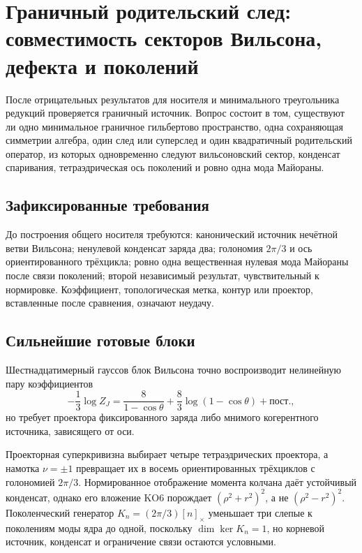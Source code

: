 \chapter{Граничный родительский след: совместимость секторов Вильсона, дефекта и поколений}

После отрицательных результатов для носителя и минимального треугольника
редукций проверяется граничный источник. Вопрос состоит в том, существуют ли
одно минимальное граничное гильбертово пространство, одна сохраняющая
симметрии алгебра, один след или суперслед и один квадратичный родительский
оператор, из которых одновременно следуют вильсоновский сектор, конденсат
спаривания, тетраэдрическая ось поколений и ровно одна мода Майораны.

\section{Зафиксированные требования}

До построения общего носителя требуются: канонический источник нечётной
ветви Вильсона; ненулевой конденсат заряда два; голономия \(2\pi/3\) и ось
ориентированного трёхцикла; ровно одна вещественная нулевая мода Майораны
после связи поколений; второй независимый результат, чувствительный к
нормировке. Коэффициент, топологическая метка, контур или проектор,
вставленные после сравнения, означают неудачу.

\section{Сильнейшие готовые блоки}

Шестнадцатимерный гауссов блок Вильсона точно воспроизводит нелинейную пару
коэффициентов
\begin{equation}
 -\frac13\log Z_J
 =\frac8{1-\cos\theta}+\frac83\log(1-\cos\theta)+\text{пост.},
\end{equation}
но требует проектора фиксированного заряда либо мнимого когерентного
источника, зависящего от оси.

Проекторная суперкривизна выбирает четыре тетраэдрических проектора, а
намотка \(\nu=\pm1\) превращает их в восемь ориентированных трёхциклов с
голономией \(2\pi/3\). Нормированное отображение момента колчана даёт
устойчивый конденсат, однако его вложение KO6 порождает
\((\rho^2+r^2)^2\), а не \((\rho^2-r^2)^2\). Поколенческий генератор
\(K_n=(2\pi/3)[n]_\times\) уменьшает три слепые к поколениям моды ядра до
одной, поскольку \(\dim\ker K_n=1\), но корневой источник, конденсат и
ограничение связи остаются условными.

